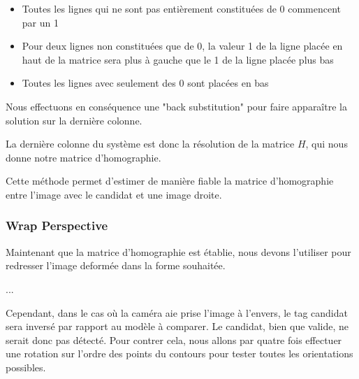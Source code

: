         \begin{itemize}
            \item Toutes les lignes qui ne sont pas entièrement constituées de 0 commencent par un 1
            \item Pour deux lignes non constituées que de 0, la valeur 1 de la ligne placée en haut de la matrice sera plus à gauche que le 1 de la ligne placée plus bas
            \item Toutes les lignes avec seulement des 0 sont placées en bas
        \end{itemize}
    
        Nous effectuons en conséquence une "back substitution" pour faire apparaître la solution sur la dernière colonne.
    
        La dernière colonne du système est donc la résolution de la matrice $H$, qui nous donne notre matrice d'homographie.

        Cette méthode permet d'estimer de manière fiable la matrice d'homographie entre l'image avec le candidat et une image droite.

        
            \subsubsection{Wrap Perspective}

            Maintenant que la matrice d'homographie est établie, nous devons l'utiliser pour redresser l'image deformée dans la forme souhaitée.

            ... 

            Cependant, dans le cas où la caméra aie prise l'image à l'envers, le tag candidat sera inversé par rapport au modèle à comparer. Le candidat, bien que valide, ne serait donc pas détecté. Pour contrer cela, nous allons par quatre fois effectuer une rotation sur l'ordre des points du contours pour tester toutes les orientations possibles.



